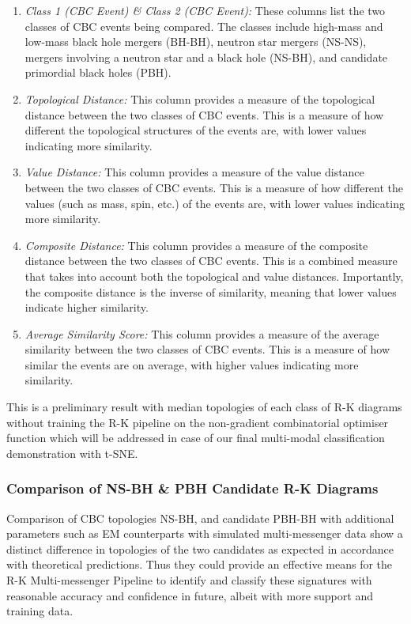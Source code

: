 \begin{enumerate}
    \item \textit{Class 1 (CBC Event) \& Class 2 (CBC Event):} These columns list the two classes of CBC events being compared. The classes include high-mass and low-mass black hole mergers (BH-BH), neutron star mergers (NS-NS), mergers involving a neutron star and a black hole (NS-BH), and candidate primordial black holes (PBH).

    \item \textit{Topological Distance:} This column provides a measure of the topological distance between the two classes of CBC events. This is a measure of how different the topological structures of the events are, with lower values indicating more similarity.

    \item  \textit{Value Distance:} This column provides a measure of the value distance between the two classes of CBC events. This is a measure of how different the values (such as mass, spin, etc.) of the events are, with lower values indicating more similarity.

    \item  \textit{Composite Distance:} This column provides a measure of the composite distance between the two classes of CBC events. This is a combined measure that takes into account both the topological and value distances. Importantly, the composite distance is the inverse of similarity, meaning that lower values indicate higher similarity.

    \item  \textit{Average Similarity Score:} This column provides a measure of the average similarity between the two classes of CBC events. This is a measure of how similar the events are on average, with higher values indicating more similarity.

\end{enumerate}
 
This is a preliminary result with median topologies of each class of R-K diagrams without training the R-K pipeline on the non-gradient combinatorial optimiser function which will be addressed in case of our final multi-modal classification demonstration with t-SNE.

\subsubsection{Comparison of NS-BH \& PBH Candidate R-K Diagrams}

Comparison of CBC topologies NS-BH, and candidate PBH-BH with additional parameters such as EM counterparts with simulated multi-messenger data show a distinct difference in topologies of the two candidates as expected in accordance with theoretical predictions. Thus they could provide an effective means for the R-K Multi-messenger Pipeline to identify and classify these signatures with reasonable accuracy and confidence in future, albeit with more support and training data.

